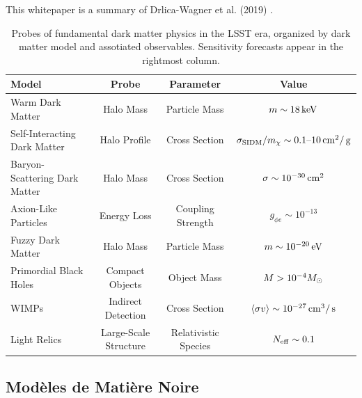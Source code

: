 \documentclass[12pt]{article}
\begin{document}
This whitepaper is a summary of Drlica-Wagner et al. (2019) \citep{drlica-wagner_2019_lsst_dark_matter}.

\begin{table}[ht]
\footnotesize
\begin{center}
\begin{tabular}{l c c c}
\hline 
Model & Probe & Parameter & Value \\
\hline 
\hline
Warm Dark Matter  & Halo Mass & Particle Mass & $m \sim 18 \mathrm{\,keV}$ \\
Self-Interacting Dark Matter & Halo Profile & Cross Section & $\sigma_{\rm SIDM}/m_\chi \sim 0.1\text{--}10\mathrm{\,cm}^2/\mathrm{\,g}$ \\
Baryon-Scattering Dark Matter & Halo Mass & Cross Section & $\sigma \sim 10^{-30} \mathrm{\,cm}^2$ \\
Axion-Like Particles & Energy Loss & Coupling Strength & $g_{\phi e} \sim 10^{-13} $ \\
Fuzzy Dark Matter & Halo Mass & Particle Mass & $m \sim 10^{-20} \mathrm{\,eV}$  \\
Primordial Black Holes  & Compact Objects & Object Mass & $M > 10^{-4} M_\odot$ \\
WIMPs & Indirect Detection & Cross Section & $\langle \sigma v \rangle \sim 10^{-27} \mathrm{\,cm}^3/\mathrm{\,s}$ \\
Light Relics & Large-Scale Structure & Relativistic Species & $N_{\rm eff} \sim 0.1$ \\[+0.5em]
\hline
\end{tabular}
\end{center}
\vspace{-1em}
\caption{\label{tab:models} Probes of fundamental dark matter physics in the LSST era, organized by dark matter model and assotiated observables. Sensitivity forecasts appear in the rightmost column.}


\end{table}

\vspace{-1em} \subsection*{Modèles de Matière Noire} \vspace{-0.5em}
\end{document}
